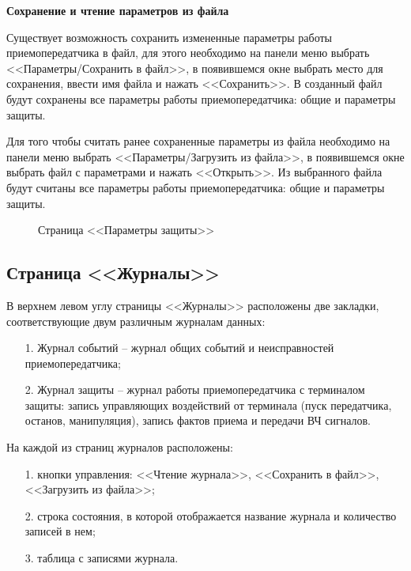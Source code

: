 \textbf{Сохранение и чтение параметров из файла}

Существует возможность сохранить измененные параметры работы приемопередатчика в файл, для этого необходимо на панели меню выбрать <<Параметры/Сохранить в файл>>, в появившемся окне выбрать место для сохранения, ввести имя файла и нажать <<Сохранить>>. В созданный файл будут сохранены все параметры работы приемопередатчика: общие и параметры защиты.

Для того чтобы считать ранее сохраненные параметры из файла необходимо на панели меню выбрать <<Параметры/Загрузить из файла>>, в появившемся окне выбрать файл с параметрами и нажать <<Открыть>>. Из выбранного файла будут считаны все параметры работы приемопередатчика: общие и параметры защиты. 

\begin{figure}[H]
	
	\caption{Страница <<Параметры защиты>>}
	\label{fig:configurator_param_def}
\end{figure}


\subsection{Страница <<Журналы>>}	\label{ssec:configurator_journal}

В верхнем левом углу страницы <<Журналы>> расположены две закладки, соответствующие двум различным журналам данных:
\begin{enumerate}
	\item[1.] Журнал событий – журнал общих событий и неисправностей приемопередатчика;
	\item[2.] Журнал защиты – журнал работы приемопередатчика с терминалом защиты: запись управляющих воздействий от терминала (пуск передатчика, останов, манипуляция), запись фактов приема и передачи ВЧ сигналов.
\end{enumerate}

На каждой из страниц журналов расположены:
\begin{enumerate}
	\item[1.] кнопки управления: <<Чтение журнала>>, <<Сохранить в файл>>, <<Загрузить из файла>>;
	\item[2.] строка состояния, в которой отображается название журнала и количество записей в нем;
	\item[3.] таблица с записями журнала.
\end{enumerate}

